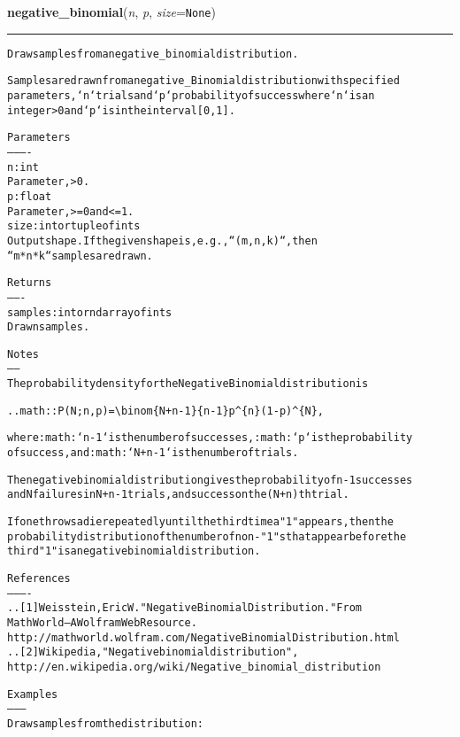     \vspace{0.5ex}

\hspace{.8\funcindent}\begin{boxedminipage}{\funcwidth}

    \raggedright \textbf{negative\_binomial}(\textit{n}, \textit{p}, \textit{size}={\tt None})

    \vspace{-1.5ex}

    \rule{\textwidth}{0.5\fboxrule}
\setlength{\parskip}{2ex}
\begin{alltt}
Draw samples from a negative\_binomial distribution.

Samples are drawn from a negative\_Binomial distribution with specified
parameters, `n` trials and `p` probability of success where `n` is an
integer {\textgreater} 0 and `p` is in the interval [0, 1].

Parameters
----------
n : int
    Parameter, {\textgreater} 0.
p : float
    Parameter, {\textgreater}= 0 and {\textless}=1.
size : int or tuple of ints
    Output shape. If the given shape is, e.g., ``(m, n, k)``, then
    ``m * n * k`` samples are drawn.

Returns
-------
samples : int or ndarray of ints
    Drawn samples.

Notes
-----
The probability density for the Negative Binomial distribution is

.. math:: P(N;n,p) = {\textbackslash}binom\{N+n-1\}\{n-1\}p{\textasciicircum}\{n\}(1-p){\textasciicircum}\{N\},

where :math:`n-1` is the number of successes, :math:`p` is the probability
of success, and :math:`N+n-1` is the number of trials.

The negative binomial distribution gives the probability of n-1 successes
and N failures in N+n-1 trials, and success on the (N+n)th trial.

If one throws a die repeatedly until the third time a "1" appears, then the
probability distribution of the number of non-"1"s that appear before the
third "1" is a negative binomial distribution.

References
----------
.. [1] Weisstein, Eric W. "Negative Binomial Distribution." From
       MathWorld--A Wolfram Web Resource.
       http://mathworld.wolfram.com/NegativeBinomialDistribution.html
.. [2] Wikipedia, "Negative binomial distribution",
       http://en.wikipedia.org/wiki/Negative\_binomial\_distribution

Examples
--------
Draw samples from the distribution:


\end{alltt}
\end{boxedminipage}

